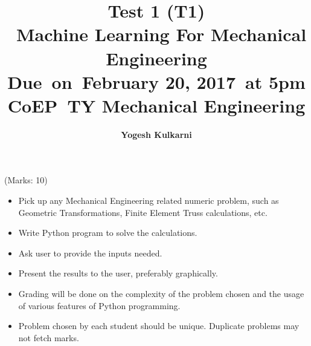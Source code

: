 



\newcommand{\hmwkTitle}{Machine Learning For Mechanical Engineering}
\newcommand{\hmwkDueDate}{February 20, 2017}
\newcommand{\hmwkClass}{Test 1 (T1)}
\newcommand{\hmwkClassTime}{TY Mechanical Engineering}
\newcommand{\hmwkClassInstructor}{CoEP}
\newcommand{\hmwkAuthorName}{\textbf{Yogesh Kulkarni}}

\title{
    \textmd{\textbf{\hmwkClass\\\ \hmwkTitle}}\\
    {Due\ on\ \hmwkDueDate\ at 5pm}\\
    \vspace{0.1in}\large{{\hmwkClassInstructor\ \hmwkClassTime}}
}

\author{\hmwkAuthorName}
\date{}



\maketitle


\begin{homeworkProblem}
(Marks: 10)
\begin{itemize}
\item Pick up any Mechanical Engineering related numeric problem, such as Geometric Transformations, Finite Element Truss calculations, etc.
\item Write Python program to solve the calculations.
\item Ask user to provide the inputs needed.
\item Present the results to the user, preferably graphically.
\item Grading will be done on the complexity of the problem chosen and the usage of various features of Python programming.
\item Problem chosen by each student should be unique. Duplicate problems may not fetch marks.
\end{itemize}
\end{homeworkProblem}


